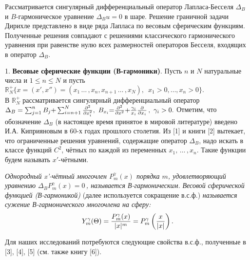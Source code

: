 \vzmscaption


Рассматривается сингулярный дифференциальный оператор Лапласа\--Бесселя $\Delta_B$ и $B$-гармоническое уравнение $\Delta_B u=0$ в шаре. Решение граничной задачи Дирихле представлено в виде ряда Лапласа по весовым сферическим функциям. Полученные решения совпадают с решениями классического гармонического уравнения при равенстве нулю всех размерностей операторов Бесселя, входящих в оператор $\Delta_B$.





  1. {\bf Весовые сферические функции (В-гармоники)}.
Пусть $n$ и $N$ натуральные числа и $1{\le}n{\le}N$ и пусть\\
$\mathbb{R}^+_N \{x{=}(x',x'')
{=}(x_1\,\ldots\,,x_n,x_{n+1}\,\ldots\,,x_N),\,\,\, x_1{>}0,\ldots,x_n{>}0\}.$ \\
 В $\mathbb{R}_N^+$ рассматривается сингулярный
дифференциальный оператор
$\Delta_B=\sum_{j=1}^nB_j{+}\sum_{i=n+1}^N{\partial^2\over\partial x_i^2},
\,\, B_{x_i}{=}{{\partial^2}\over {\partial x^2}}{+}{\gamma_i\over {x_i}}
{\partial\over{\partial x_i}}\,,\,\, \gamma_i>0.$ Отметим, что обозначение $\Delta_B$ (в настоящее время принятое в мировой литературе) введено И.А. Киприяновым в 60-х годах прошлого столетия. Из [1] %
и книги [2]
вытекает, что ограниченные решения уравнений, содержащие оператор $\Delta_B$, надо искать в классе функций $C^2$, чётных по каждой из переменных $x_1,\,\ldots\,,x_n$. Такие функции будем называть $x'$-чётными.


{\it Однородный x'-чётный многочлен $P_m^\gamma(x)$ порядка $m$,  удовлетворяющий
уравнению $ \Delta_BP_m^\gamma(x)= 0$\,, называется В-гармоничес\-ким.}
{\it Весовой сферической функцией (В-гармоникой)} (далее используется сок\-ра\-ще\-ние в.с.ф.)
{\it называется сужение В-гармонического многочлена на сферу:}
$$Y_m^\gamma(\Theta)={P_m^\gamma(x)\over|x|^m}= P_m^\gamma\left(x\over|x|
\right).$$

    Для наших исследований потребуются следующие свойства в.с.ф., полученные в [3], [4], [5]
 (см. также книгу [6]).


